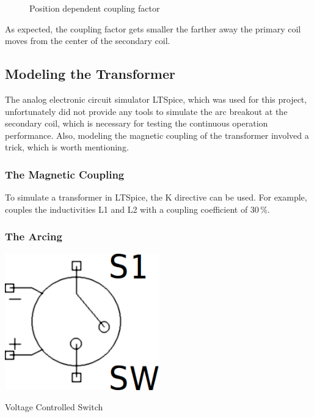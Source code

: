 \begin{figure}[h!]
    \centering
    \caption{Position dependent coupling factor}
    \label{fig:coupling-factor}
\end{figure}

As expected, the coupling factor gets smaller the farther away the primary coil moves from the center of the secondary coil.

\subsection{Modeling the Transformer}

The analog electronic circuit simulator LTSpice, which was used for this project, unfortunately did not provide any tools to simulate the arc breakout at the secondary coil, which is necessary for testing the continuous operation performance. Also, modeling the magnetic coupling of the transformer involved a trick, which is worth mentioning.

\subsubsection{The Magnetic Coupling}


To simulate a transformer in LTSpice, the K directive can be used. For example,  couples the inductivities L1 and L2 with a coupling coefficient of 30\,\%.

\subsubsection{The Arcing}

\begin{marginfigure}[5mm]
    \centering
    \includegraphics[width=0.5\textwidth]{simon/resources/ltspice_sw.png}
    \caption{Voltage Controlled Switch}
    \label{fig:ltspice_sw}
\end{marginfigure}

